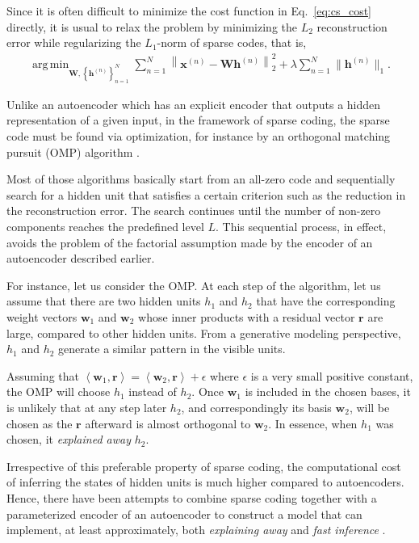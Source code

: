 \documentclass[dissertation,nocontribution,draft*]{aaltoseries}
\newcommand{\vect}[1]{\mathbf{#1}}
\newcommand{\matr}[1]{\mathbf{#1}}
\newcommand{\vh}[0]{\vect{h}}
\newcommand{\vx}[0]{\vect{x}}
\newcommand{\vr}[0]{\vect{r}}
\newcommand{\vw}[0]{\vect{w}}
\newcommand{\mW}[0]{\matr{W}}
\DeclareMathOperator*{\argmin}{arg\,min}
\begin{document}
Since it is often difficult to minimize the cost function in
Eq.~\eqref{eq:cs_cost} directly, it is usual to relax the
problem by minimizing the $L_2$ reconstruction error while
regularizing the $L_1$-norm of sparse codes, that is,
\begin{align}
    \label{eq:sp_cost}
    \argmin_{\mW, \left\{ \vh^{(n)} \right\}_{n=1}^N }
    \sum_{n=1}^N \left\| \vx^{(n)} - \mW \vh^{(n)}
    \right\|_2^2 + \lambda \sum_{n=1}^N \| \vh^{(n)} \|_1.
\end{align}

Unlike an autoencoder which has an explicit encoder that
outputs a hidden representation of a given input, in the
framework of sparse coding, the sparse code must be found
via optimization, for instance by an orthogonal matching
pursuit (OMP) algorithm \citep{Davis1994}.

Most of those algorithms basically start from an all-zero
code and sequentially search for a hidden unit that
satisfies a certain criterion such as the reduction in the
reconstruction error. The search continues until the number
of non-zero components reaches the predefined level $L$.
This sequential process, in effect, avoids the problem of
the factorial assumption made by the encoder of an
autoencoder described earlier. 

For instance, let us consider the OMP. At each step of the
algorithm, let us assume that there are two hidden units
$h_1$ and $h_2$ that have the corresponding weight vectors
$\vw_1$ and $\vw_2$ whose inner products with a residual
vector $\vr$ are large, compared to other hidden units. From
a generative modeling perspective, $h_1$ and $h_2$ generate
a similar pattern in the visible units.

Assuming that $\left< \vw_1, \vr\right> = \left< \vw_2,
\vr\right> + \epsilon$ where $\epsilon$ is a very small
positive constant, the OMP will choose $h_1$ instead of $h_2$. Once
$\vw_1$ is included in the chosen bases, it is unlikely that
at any step later $h_2$, and correspondingly its basis
$\vw_2$, will be chosen as the $\vr$ afterward is almost
orthogonal to $\vw_2$. In essence, when $h_1$ was chosen, it
\textit{explained away} $h_2$.

Irrespective of this preferable property of sparse coding,
the computational cost of inferring the states of hidden
units is much higher compared to autoencoders. Hence, there
have been attempts to combine sparse coding together with a
parameterized encoder of an autoencoder to construct a model
that can implement, at least approximately, both
\textit{explaining away} and \textit{fast inference}
\citep[see, e.g.,][]{Kavukcuoglu2010,Gregor2010}.
\end{document}
